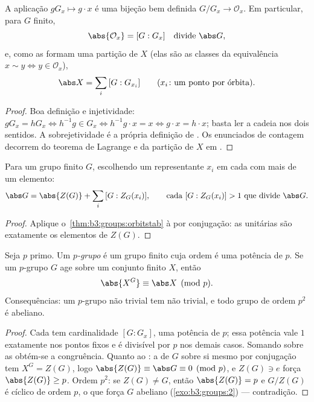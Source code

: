 \begin{theorem}\label{thm:b3:groups:orbitstab}
A aplicação $gG_x \mapsto g \cdot x$ é uma bijeção bem definida $G/G_x \to \mathcal O_x$. Em particular, para
$G$ finito,
\[
\abs{\mathcal O_x} = [G : G_x] \quad\text{divide } \abs G,
\]
e, como as  formam uma partição de $X$ (elas são as classes
da equivalência $x \sim y \iff y \in \mathcal O_x$),
\[
\abs X = \sum_{i} \,[G : G_{x_i}]
\qquad (x_i\colon \text{um ponto por órbita}).
\]
\end{theorem}

\begin{proof}
Boa definição e injetividade: $gG_x = hG_x \iff h^{-1}g \in G_x \iff
h^{-1}g \cdot x = x \iff g \cdot x = h \cdot x$; basta ler a cadeia nos dois
sentidos. A sobrejetividade é a própria definição de . Os
enunciados de contagem decorrem do teorema de Lagrange e da partição de
$X$ em .
\end{proof}

\begin{corollary}\label{cor:b3:groups:classeq}
Para um grupo finito $G$, escolhendo um representante $x_i$ em
cada  com mais de um elemento:
\[
\abs G = \abs{Z(G)} + \sum_i \,[G : Z_G(x_i)],
\qquad\text{cada } [G : Z_G(x_i)] > 1 \text{ que divide } \abs G.
\]
\end{corollary}

\begin{proof}
Aplique o~\cref{thm:b3:groups:orbitstab} à  por conjugação: as  unitárias
são exatamente os elementos de $Z(G)$.
\end{proof}

\begin{theorem}\label{thm:b3:groups:pfixed}
Seja $p$ primo. Um \emph{$p$-grupo}
é um grupo finito cuja ordem é uma potência de $p$. Se um
$p$-grupo $G$ age sobre um conjunto finito $X$, então
\[
\abs{X^G} \equiv \abs X \pmod p .
\]
Consequências: um $p$-grupo não trivial tem  não trivial, e
todo grupo de ordem $p^2$ é abeliano.
\end{theorem}

\begin{proof}
Cada  tem cardinalidade $[G:G_x]$, uma potência de $p$; essa
potência vale $1$ exatamente nos pontos fixos e é divisível por
$p$ nos demais casos. Somando sobre as  obtém-se a
congruência. Quanto ao : a  de $G$ sobre si mesmo por
conjugação tem $X^G = Z(G)$, logo $\abs{Z(G)} \equiv
\abs G \equiv 0 \pmod p$, e $Z(G) \ni e$ força $\abs{Z(G)} \geq
p$. Ordem
$p^2$: se $Z(G) \neq G$, então $\abs{Z(G)} = p$ e $G/Z(G)$ é cíclico de ordem
$p$, o que força $G$ abeliano (\cref{exo:b3:groups:2}) --- contradição.
\end{proof}

